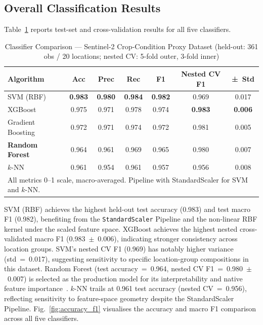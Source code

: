 \documentclass[conference]{IEEEtran}
\begin{document}
\subsection{Overall Classification Results}

Table~\ref{tab:overall} reports test-set and cross-validation results for all
five classifiers.

\begin{table}[htbp]
  \caption{Classifier Comparison — Sentinel-2 Crop-Condition Proxy Dataset
           (held-out: 361 obs / 20 locations; nested CV: 5-fold outer, 3-fold inner)}
  \label{tab:overall}
  \centering
  \renewcommand{\arraystretch}{1.2}
  \begin{tabular}{lcccccc}
    \toprule
    \textbf{Algorithm} & \textbf{Acc} & \textbf{Prec} & \textbf{Rec} & \textbf{F1} & \textbf{Nested CV F1} & \textbf{±~Std} \\
    \midrule
    SVM (RBF)               & \textbf{0.983} & \textbf{0.980} & \textbf{0.984} & \textbf{0.982} & 0.969 & 0.017 \\
    XGBoost                 & 0.975 & 0.971 & 0.978 & 0.974 & \textbf{0.983} & \textbf{0.006} \\
    Gradient Boosting       & 0.972 & 0.971 & 0.974 & 0.972 & 0.981 & 0.005 \\
    \textbf{Random Forest}  & 0.964 & 0.961 & 0.969 & 0.965 & 0.980 & 0.007 \\
    $k$-NN                  & 0.961 & 0.954 & 0.961 & 0.957 & 0.956 & 0.008 \\
    \bottomrule
    \multicolumn{7}{l}{\small All metrics 0--1 scale, macro-averaged. Pipeline with StandardScaler for SVM and $k$-NN.}
  \end{tabular}
\end{table}

SVM (RBF) achieves the highest held-out test accuracy (0.983) and test macro
F1 (0.982), benefiting from the \texttt{StandardScaler} Pipeline and the
non-linear RBF kernel under the scaled feature space. XGBoost achieves the
highest nested cross-validated macro F1 (0.983~$\pm$~0.006), indicating
stronger consistency across location groups. SVM's nested CV F1 (0.969) has
notably higher variance (std~=~0.017), suggesting sensitivity to specific
location-group compositions in this dataset. Random Forest (test
accuracy~=~0.964, nested CV F1~=~0.980~$\pm$~0.007) is selected as the
production model for its interpretability and native feature
importance~\cite{breiman2001,karthikeyan2020}. $k$-NN trails at 0.961 test
accuracy (nested CV~=~0.956), reflecting sensitivity to feature-space geometry
despite the StandardScaler Pipeline.
Fig.~\ref{fig:accuracy_f1} visualises the accuracy and macro F1 comparison
across all five classifiers.
\end{document}
